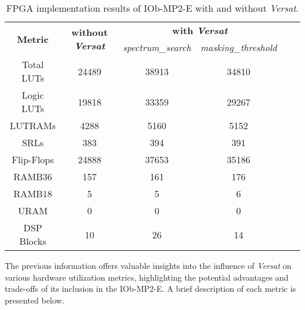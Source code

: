\begin{table}[H]
    \centering
    \begin{tabular}{|c|c|c|c|c|c|}
    \hline
     \multirow{2}{*}{\parbox{2.5cm}{\centering \textbf{Metric}}}  &  \multirow{2}{*}{\parbox{2.5cm}{\centering \textbf{without \textit{Versat}}}} & \multicolumn{2}{c|}{\textbf{with \textit{Versat}}} \\
    \cline{3-4}
     & & \textit{spectrum\_search} & \textit{masking\_threshold} \\
    \hline
    \multicolumn{1}{|c|}{Total LUTs}  & 24489 &  38913 & 34810\\ 
    \hline
    \multicolumn{1}{|c|}{Logic LUTs}  & 19818 &  33359 & 29267\\ 
    \hline
    \multicolumn{1}{|c|}{LUTRAMs}  & 4288 & 5160 & 5152\\ 
    \hline
    \multicolumn{1}{|c|}{SRLs}  & 383 & 394 & 391\\ 
    \hline
    \multicolumn{1}{|c|}{Flip-Flops}  & 24888 & 37653 &  35186\\ 
    \hline
    \multicolumn{1}{|c|}{RAMB36}  & 157 &  161 &  176\\ 
    \hline
    \multicolumn{1}{|c|}{RAMB18}  & 5 &  5 & 6\\ 
    \hline
    \multicolumn{1}{|c|}{URAM}  & 0 &  0 & 0\\ 
    \hline
    \multicolumn{1}{|c|}{DSP Blocks}  & 10 & 26 & 14\\ 
    \hline
    \end{tabular}
    \caption{FPGA implementation results of IOb-MP2-E with and without \textit{Versat}.}
    \label{implementation}
\end{table}

\vspace{0.5cm}

The previous information offers valuable insights into the influence of \textit{Versat} on various hardware utilization metrics, highlighting the potential advantages and trade-offs of its inclusion in the IOb-MP2-E. A brief description of each metric is presented below.

